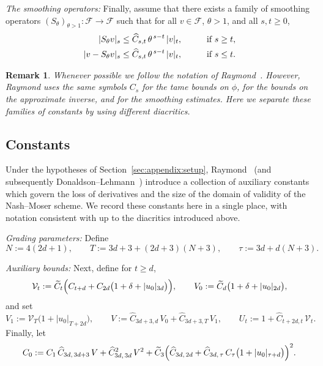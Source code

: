 \documentclass[11pt]{amsart}
\newcommand{\F}{\mathcal{F}}
\newtheorem{remark}[theorem]{Remark}
\begin{document}
\medskip
\noindent
\textit{The smoothing operators:}
Finally, assume that there exists a family of smoothing operators
$(S_{\theta})_{\theta>1}\colon \F\to \F$ such that for all $v\in \F$, $\theta>1$,
and all $s,t\ge 0$,
\begin{align}
	|S_\theta v|_s &\le \widehat{C}_{s,t}\,\theta^{\,s-t}\,|v|_t,
	\qquad &&\text{if } s\ge t, \notag\\
	|v-S_\theta v|_s &\le \widehat{C}_{s,t}\,\theta^{\,s-t}\,|v|_t,
	\qquad &&\text{if } s\le t.
	\label{eq:estimates-smoothing-operators}
\end{align}

\begin{remark}
	Whenever possible we follow the notation of Raymond~\cite{Raymond1989}.
	However, Raymond uses the same symbols $C_s$ for the tame bounds on $\phi$,
	for the bounds on the approximate inverse, and for the smoothing estimates.
	Here we separate these families of constants by using different diacritics.
\end{remark}

\subsection{Constants}
\label{sec:appendix:constants}

Under the hypotheses of Section~\ref{sec:appendix:setup}, Raymond~\cite{Raymond1989}
(and subsequently Donaldson--Lehmann~\cite{DonaldsonLehmann2024}) introduce a collection of
auxiliary constants which govern the loss of derivatives and the size of the domain of
validity of the Nash--Moser scheme.  We record these constants here in a single place, with
notation consistent with \cite{Raymond1989} up to the diacritics introduced above.

\medskip
\noindent
\textit{Grading parameters:}
Define
\[
N := 4(2d+1),\qquad
T := 3d + 3 + (2d+3)(N+3),\qquad
\tau := 3d + d(N+3).
\]

\medskip
\noindent
\textit{Auxiliary bounds:}
Next, define for $t\ge d$,
\[
\mathcal{V}_t :=
\widetilde{C}_t\Bigl( C_{t+d} + C_{2d}\bigl(1+\delta+|u_0|_{3d}\bigr)\Bigr),
\qquad
V_0 := \widetilde{C}_d\bigl(1+\delta+|u_0|_{2d}\bigr),
\]
and set
\[
V_1 := \mathcal{V}_T\bigl(1+|u_0|_{T+2d}\bigr),\qquad
V := \widehat{C}_{3d+3,d}\,V_0 + \widehat{C}_{3d+3,T}\,V_1,
\qquad
U_t := 1+\widehat{C}_{t+2d,t}\,\mathcal{V}_t.
\]
Finally, let
\[
C_0 :=
C_1\,\widehat{C}_{3d,\,3d+3}\,V
+\widehat{C}_{3d,\,3d}^2\,V^2
+\widetilde{C}_3\Bigl(
\widehat{C}_{3d,\,2d}
+\widehat{C}_{3d,\,\tau}\,C_\tau\bigl(1+|u_0|_{\tau+d}\bigr)
\Bigr)^2.
\]
\end{document}

